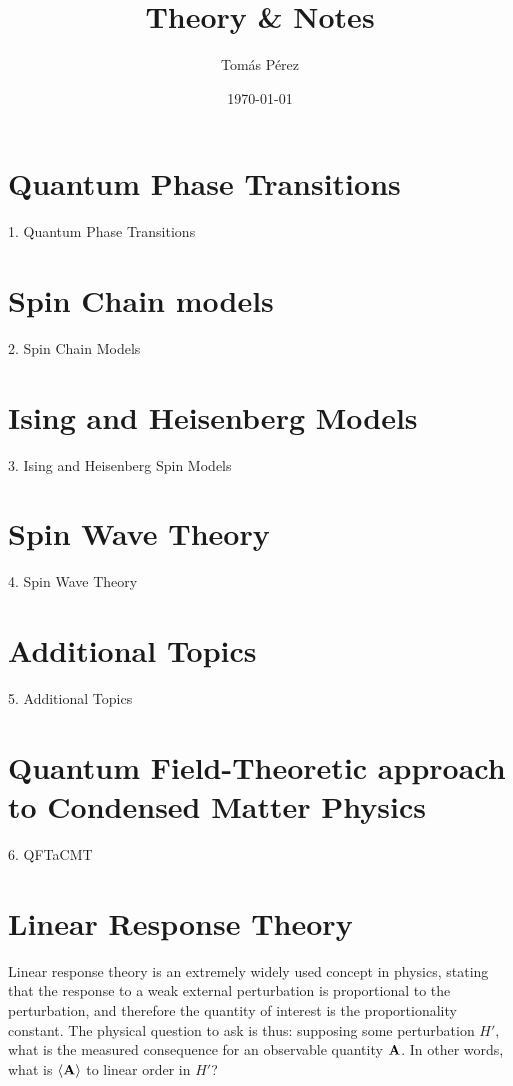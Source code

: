 \documentclass{homework}
\author{Tomás Pérez}
\date{\today}
\title{Theory \& Notes}
\begin{document}
 \maketitle

\tableofcontents
\section{\textbf{Quantum Phase Transitions}}
{1. Quantum Phase Transitions}
\clearpage

\section{\textbf{Spin Chain models}}
{2. Spin Chain Models}
\clearpage

\section{\textbf{Ising and Heisenberg Models}}
{3. Ising and Heisenberg Spin Models}
\clearpage

\section{\textbf{Spin Wave Theory}}
{4. Spin Wave Theory}
\clearpage

\section{\textbf{Additional Topics}}
{5. Additional Topics}
\clearpage

\section{\textbf{Quantum Field-Theoretic approach to Condensed Matter Physics}}
{6. QFTaCMT}

\clearpage

\section{Linear Response Theory}

Linear response theory is an extremely widely used concept in physics, stating that the response to a weak external perturbation is proportional to the perturbation, and therefore the quantity of interest is the proportionality constant. The physical question to ask is thus: supposing some perturbation $H'$, what is the measured consequence for an observable quantity ${\bf A}$. In other words, what is $\langle {\bf A} \rangle$ to linear order in $H'$? 
\end{document}
